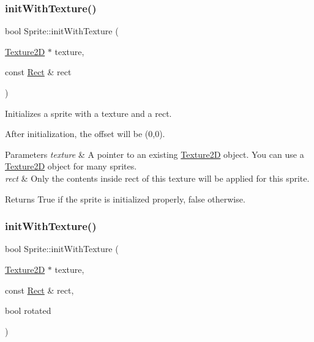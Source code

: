 \subsubsection{\texorpdfstring{init\+With\+Texture()}{initWithTexture()}\hspace{0.1cm}{\footnotesize\ttfamily [2/6]}}
{\footnotesize\ttfamily bool Sprite\+::init\+With\+Texture (\begin{DoxyParamCaption}\item[{\hyperlink{classTexture2D}{Texture2D} $\ast$}]{texture,  }\item[{const \hyperlink{classRect}{Rect} \&}]{rect }\end{DoxyParamCaption})\hspace{0.3cm}{\ttfamily [virtual]}}

Initializes a sprite with a texture and a rect.

After initialization, the offset will be (0,0).


\begin{DoxyParams}{Parameters}
{\em texture} & A pointer to an existing \hyperlink{classTexture2D}{Texture2D} object. You can use a \hyperlink{classTexture2D}{Texture2D} object for many sprites. \\
\hline
{\em rect} & Only the contents inside rect of this texture will be applied for this sprite. \\
\hline
\end{DoxyParams}
\begin{DoxyReturn}{Returns}
True if the sprite is initialized properly, false otherwise. 
\end{DoxyReturn}
\mbox{\label{classSprite_a4866d1d8a09f7617ed7fa838f59ba828}} 
\subsubsection{\texorpdfstring{init\+With\+Texture()}{initWithTexture()}\hspace{0.1cm}{\footnotesize\ttfamily [3/6]}}
{\footnotesize\ttfamily bool Sprite\+::init\+With\+Texture (\begin{DoxyParamCaption}\item[{\hyperlink{classTexture2D}{Texture2D} $\ast$}]{texture,  }\item[{const \hyperlink{classRect}{Rect} \&}]{rect,  }\item[{bool}]{rotated }\end{DoxyParamCaption})\hspace{0.3cm}{\ttfamily [virtual]}}

